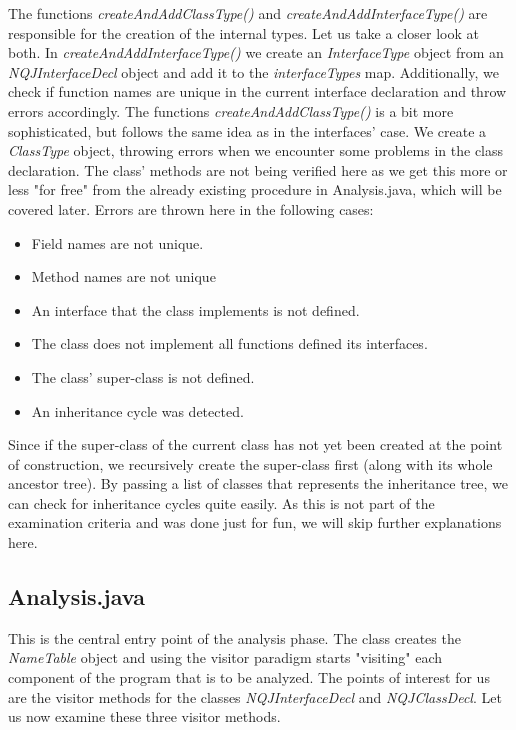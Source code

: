 The functions \textit{createAndAddClassType()} and 
\textit{createAndAddInterfaceType()} are responsible for the creation of the internal types.
Let us take a closer look at both.
In \textit{createAndAddInterfaceType()} we create an \textit{InterfaceType} object from
an \textit{NQJInterfaceDecl} object and add it to the \textit{interfaceTypes} map.
Additionally, we check if function names are unique in the current interface declaration
and throw errors accordingly.
The functions \textit{createAndAddClassType()} is a bit more sophisticated, but
follows the same idea as in the interfaces' case. 
We create a \textit{ClassType} object, throwing errors when we encounter
some problems in the class declaration. The class' methods are not
being verified here as we get this more or less "for free" from
the already existing procedure in Analysis.java, which will be covered later.
Errors are thrown here in the following cases:
\begin{itemize}
    \item Field names are not unique.
    \item Method names are not unique
    \item An interface that the class implements is not defined.
    \item The class does not implement all functions defined its interfaces.
    \item The class' super-class is not defined.
    \item An inheritance cycle was detected.
\end{itemize}
Since if the super-class of the current class has not yet been created at the point
of construction, we recursively create the super-class first 
(along with its whole ancestor tree).
By passing a list of classes that represents the inheritance tree, we can
check for inheritance cycles quite easily. 
As this is not part of the examination criteria and was done just
for fun, we will skip further explanations here.

\subsection{Analysis.java}
This is the central entry point of the analysis phase. The class creates the
\textit{NameTable} object and using the visitor paradigm starts "visiting"
each component of the program that is to be analyzed.
The points of interest for us are the visitor methods for the classes
\textit{NQJInterfaceDecl} and \textit{NQJClassDecl}.
Let us now examine these three visitor methods.

